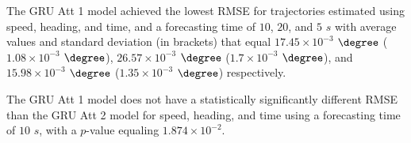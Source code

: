 \begin{table}[!ht]
	\centering
	\caption{The average RMSE in $\degree$ ($\times 10^{-2}$), with standard deviation in brackets, across $k$-fold validation datasets for the trajectories in the $k$-fold testing datasets estimated using speed, heading, and time, different RNN models, and forecasting times.}
	\label{tab:best_speed_actual_dir_RMSE}
\end{table}

The GRU Att 1 model achieved the lowest RMSE for trajectories estimated using speed, heading, and time, and a forecasting time of $10$, $20$, and $5$ $s$ with average values and standard deviation (in brackets) that equal $17.45 \times 10^{-3}$ $\degree$ ($1.08 \times 10^{-3}$ $\degree$), $26.57 \times 10^{-3}$ $\degree$ ($1.7 \times 10^{-3}$ $\degree$), and $15.98 \times 10^{-3}$ $\degree$ ($1.35 \times 10^{-3}$ $\degree$) respectively.

The GRU Att 1 model does not have a statistically significantly different RMSE than the GRU Att 2 model for speed, heading, and time using a forecasting time of $10$ $s$, with a $p$-value equaling $1.874 \times 10^{-2}$.

